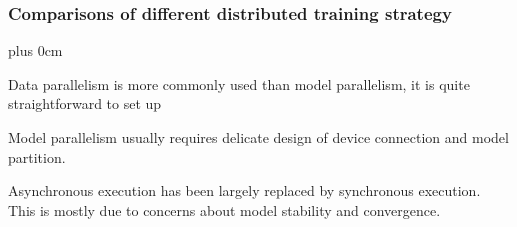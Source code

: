 \documentclass[11pt]{beamer}
\renewcommand{\raggedright}{\leftskip=0pt \rightskip=0pt plus 0cm}
\let\olditemize=\itemize
\renewenvironment{itemize}{\olditemize\raggedright}{\endlist}
\begin{document}
\begin{frame}
{\begin{figure}[h]
		\label{fig:06}
	\end{figure}
}
\end{frame}
\begin{frame}
	\frametitle{Comparisons of different distributed training strategy}
	\begin{itemize}
		\item Data parallelism is more commonly used than model parallelism, it is quite straightforward to set up
		\item Model parallelism usually requires delicate design of device connection and model partition.
		\item Asynchronous execution has been largely replaced by synchronous execution. This is mostly due to concerns about model stability and convergence.
	\end{itemize}
\end{frame}
\end{document}
